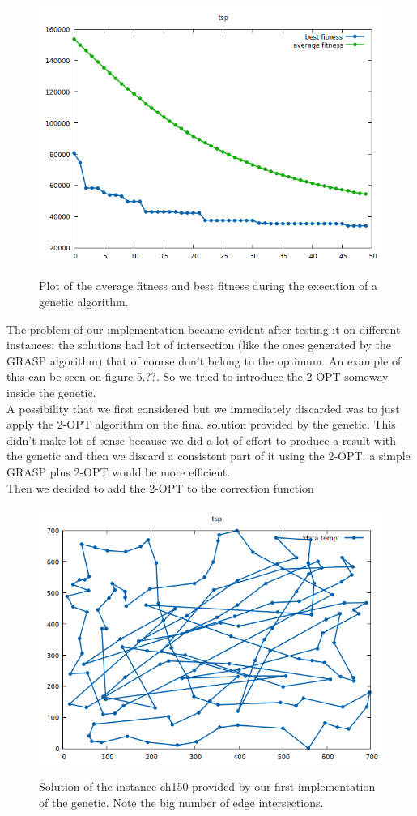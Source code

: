 \begin{figure}[h!]
\centering
	\includegraphics[scale=0.6]{media/fitnessPlot.png} \\
	\caption{Plot of the average fitness and best fitness during the execution of a genetic algorithm.}
\end{figure}

\noindent The problem of our implementation became evident after testing it on different instances: the solutions had lot of intersection (like the ones generated by the GRASP algorithm) that of course don't belong to the optimum. An example of this can be seen on figure 5.??. So we tried to introduce the 2-OPT someway inside the genetic. \\
A possibility that we first considered but we immediately discarded was to just apply the 2-OPT algorithm on the final solution provided by the genetic. This didn't make lot of sense because we did a lot of effort to produce a result with the genetic and then we discard a consistent part of it using the 2-OPT: a simple GRASP plus 2-OPT would be more efficient. \\
Then we decided to add the 2-OPT to the correction function

\begin{figure}[h!]
\centering
	\includegraphics[scale=0.6]{media/genetic.png} \\
	\caption{Solution of the instance ch150 provided by our first implementation of the genetic. Note the big number of edge intersections.}
\end{figure}


